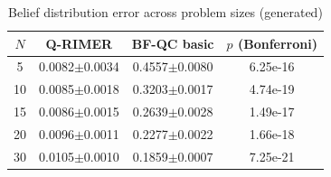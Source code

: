 \begin{table}[h]
\small
\centering
\caption{Belief distribution error across problem sizes (generated)}
\label{tab:comp}
\begin{tabular}{cccc}
\hline
$N$&Q-RIMER&BF-QC basic&$p$ (Bonferroni)\\
\hline
5&0.0082$\pm$0.0034&0.4557$\pm$0.0080&6.25e-16\\
10&0.0085$\pm$0.0018&0.3203$\pm$0.0017&4.74e-19\\
15&0.0086$\pm$0.0015&0.2639$\pm$0.0028&1.49e-17\\
20&0.0096$\pm$0.0011&0.2277$\pm$0.0022&1.66e-18\\
30&0.0105$\pm$0.0010&0.1859$\pm$0.0007&7.25e-21\\
\hline
\end{tabular}
\end{table}
